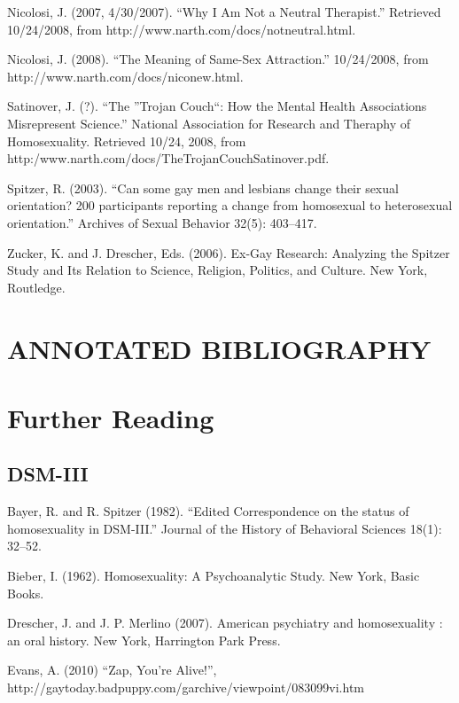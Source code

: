 Nicolosi, J. (2007, 4\slash 30\slash 2007). ``Why I Am Not a Neutral Therapist.'' Retrieved 10\slash 24\slash 2008, from http:\slash \slash www.narth.com\slash docs\slash notneutral.html.

Nicolosi, J. (2008). ``The Meaning of Same-Sex Attraction.'' 10\slash 24\slash 2008, from http:\slash \slash www.narth.com\slash docs\slash niconew.html.

Satinover, J. (?). ``The ''Trojan Couch``: How the Mental Health Associations Misrepresent Science.'' National Association for Research and Theraphy of Homosexuality. Retrieved 10\slash 24, 2008, from http:\slash www.narth.com\slash docs\slash TheTrojanCouchSatinover.pdf.

Spitzer, R. (2003). ``Can some gay men and lesbians change their sexual orientation? 200 participants reporting a change from homosexual to heterosexual orientation.'' Archives of Sexual Behavior 32(5): 403--417.

Zucker, K. and J. Drescher, Eds. (2006). Ex-Gay Research: Analyzing the Spitzer Study and Its Relation to Science, Religion, Politics, and Culture. New York, Routledge.

\pagebreak 

\chapter{ANNOTATED BIBLIOGRAPHY}
\label{annotatedbibliography}

\chapter{Further Reading}
\label{furtherreading}

\section{DSM-III}
\label{dsm-iii}

Bayer, R. and R. Spitzer (1982). ``Edited Correspondence on the status of homosexuality in DSM-III.'' Journal of the History of Behavioral Sciences 18(1): 32--52.

Bieber, I. (1962). Homosexuality: A Psychoanalytic Study. New York, Basic Books.

Drescher, J. and J. P. Merlino (2007). American psychiatry and homosexuality : an oral history. New York, Harrington Park Press.

Evans, A. (2010) “Zap, You're Alive!”, http:\slash \slash gaytoday.badpuppy.com\slash garchive\slash viewpoint\slash 083099vi.htm

